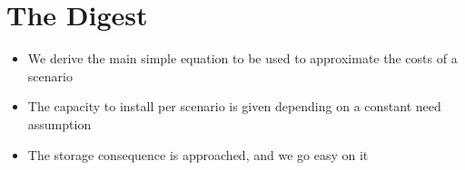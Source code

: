 \section{The Digest}


\begin{kaoboxgreen}[frametitle=Main Takeaways]

\begin{itemize}
\item We derive the main simple equation to be used to approximate the costs of a scenario
\item The capacity to install per scenario is given depending on a constant need assumption
\item The storage consequence is approached, and we go easy on it
\end{itemize}
  
\end{kaoboxgreen}